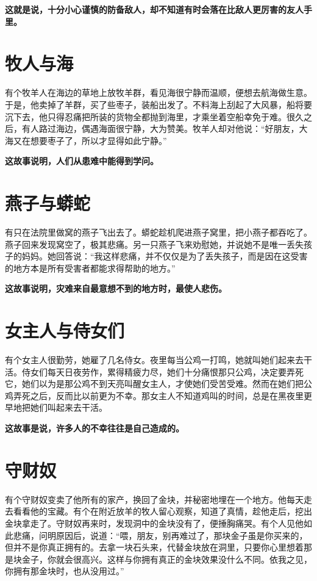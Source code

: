 {\bfseries \color{red}这就是说，十分小心谨慎的防备敌人，却不知道有时会落在比敌人更厉害的友人手里。}

\section{牧人与海}

有个牧羊人在海边的草地上放牧羊群，看见海很宁静而温顺，便想去航海做生意。于是，他卖掉了羊群，买了些枣子，装船出发了。不料海上刮起了大风暴，船将要沉下去，他只得忍痛把所装的货物全都抛到海里，才乘坐着空船幸免于难。很久之后，有人路过海边，偶遇海面很宁静，大为赞美。牧羊人却对他说：“好朋友，大海又在想要枣子了，所以才显得如此宁静。”

{\bfseries \color{red}这故事说明，人们从患难中能得到学问。}

\section{燕子与蟒蛇}

有只在法院里做窝的燕子飞出去了。蟒蛇趁机爬进燕子窝里，把小燕子都吞吃了。燕子回来发现窝空了，极其悲痛。另一只燕子飞来劝慰她，并说她不是唯一丢失孩子的妈妈。她回答说：“我这样悲痛，并不仅仅是为了丢失孩子，而是因在这受害的地方本是所有受害者都能求得帮助的地方。”

{\bfseries \color{red}这故事说明，灾难来自最意想不到的地方时，最使人悲伤。}

\section{女主人与侍女们}

有个女主人很勤劳，她雇了几名侍女。夜里每当公鸡一打鸣，她就叫她们起来去干活。侍女们每天日夜劳作，累得精疲力尽，她们十分痛恨那只公鸡，决定要弄死它，她们以为是那公鸡不到天亮叫醒女主人，才使她们受苦受难。然而在她们把公鸡弄死之后，反而比以前更为不幸。那女主人不知道鸡叫的时间，总是在黑夜里更早地把她们叫起来去干活。

{\bfseries \color{red}这故事是说，许多人的不幸往往是自己造成的。}

\section{守财奴}

有个守财奴变卖了他所有的家产，换回了金块，并秘密地埋在一个地方。他每天走去看看他的宝藏。有个在附近放羊的牧人留心观察，知道了真情，趁他走后，挖出金块拿走了。守财奴再来时，发现洞中的金块没有了，便捶胸痛哭。有个人见他如此悲痛，问明原因后，说道：“喂，朋友，别再难过了，那块金子虽是你买来的，但并不是你真正拥有的。去拿一块石头来，代替金块放在洞里，只要你心里想着那是块金子，你就会很高兴。这样与你拥有真正的金块效果没什么不同。依我之见，你拥有那金块时，也从没用过。”

